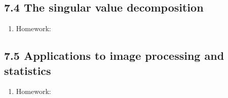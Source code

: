 \documentclass{article}
\begin{document}
\subsection{7.4 The singular value decomposition}

\begin{enumerate}

\item Homework: 

\end{enumerate}

\subsection{7.5 Applications to image processing and statistics}

\begin{enumerate}

\item Homework: 

\end{enumerate}
\end{document}
